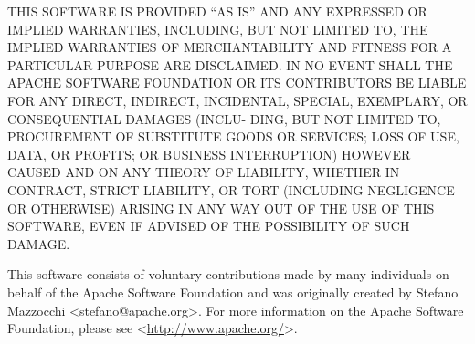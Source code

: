 \begin{multicols}{3}
\begin{itemize}
 \end{itemize}
  
 THIS SOFTWARE IS PROVIDED ``AS IS'' AND ANY EXPRESSED OR IMPLIED WARRANTIES,
 INCLUDING, BUT NOT LIMITED TO, THE IMPLIED WARRANTIES OF MERCHANTABILITY AND
 FITNESS  FOR A PARTICULAR  PURPOSE ARE  DISCLAIMED.  IN NO  EVENT SHALL  THE
 APACHE SOFTWARE  FOUNDATION  OR ITS CONTRIBUTORS  BE LIABLE FOR  ANY DIRECT,
 INDIRECT, INCIDENTAL, SPECIAL,  EXEMPLARY, OR CONSEQUENTIAL  DAMAGES (INCLU-
 DING, BUT NOT LIMITED TO, PROCUREMENT  OF SUBSTITUTE GOODS OR SERVICES; LOSS
 OF USE, DATA, OR  PROFITS; OR BUSINESS  INTERRUPTION)  HOWEVER CAUSED AND ON
 ANY  THEORY OF LIABILITY,  WHETHER  IN CONTRACT,  STRICT LIABILITY,  OR TORT
 (INCLUDING  NEGLIGENCE OR  OTHERWISE) ARISING IN  ANY WAY OUT OF THE  USE OF
 THIS SOFTWARE, EVEN IF ADVISED OF THE POSSIBILITY OF SUCH DAMAGE.
 
 This software  consists of voluntary contributions made  by many individuals
 on  behalf of the Apache Software  Foundation and was  originally created by
 Stefano Mazzocchi  <stefano@apache.org>. For more  information on the Apache 
 Software Foundation, please see <\url{http://www.apache.org/}>.
\end{multicols}
